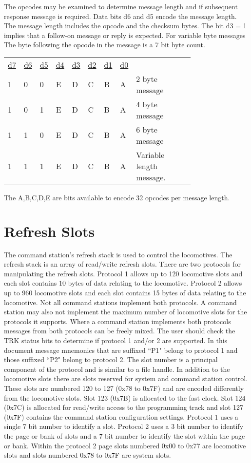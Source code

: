 The opcodes may be examined to determine message length and if subsequent response message is required. Data bits d6 and d5 encode the message length. The message length includes the opcode and the checksum bytes. The bit d3 = 1 implies that a follow-on message or reply is expected. For variable byte messages  The byte following the opcode in the message is a 7 bit byte count.

\begin{tabular}{p{0.05\linewidth} p{0.05\linewidth}  p{0.05\linewidth}  p{0.05\linewidth}  p{0.05\linewidth}  p{0.05\linewidth}  p{0.05\linewidth}  p{0.05\linewidth} p{0.36\linewidth}} 
\underline{d7} & \underline{d6} & \underline{d5} & \underline{d4} & \underline{d3} & \underline{d2} & \underline{d1} & \underline{d0} & \\
1 & 0 & 0 & E & D & C & B & A & 2 byte message\\
1 & 0 & 1 & E & D & C & B & A & 4 byte message\\
1 & 1 & 0 & E & D & C & B & A & 6 byte message\\
1 & 1 & 1 & E & D & C & B & A & Variable length message.\\
\end{tabular}

The A,B,C,D,E are bits available to encode 32 opcodes per message length.

\section{Refresh Slots}

The command station's refresh stack is used to control the locomotives. The refresh stack is an array of read/write refresh slots. There are two protocols for manipulating the refresh slots. Protocol 1 allows up to 120 locomotive slots and each slot contains 10 bytes of data relating to the locomotive. Protocol 2 allows up to 960 locomotive slots and each slot contains 15 bytes of data relating to the locomotive. Not all command stations implement both protocols. A command station may also not implement the maximum number of locomotive slots for the protocols it supports. Where a command station implements both protocols messages from both protocols can be freely mixed. The user should check the TRK status bits to determine if protocol 1 and/or 2 are supported. In this document message mnemonics that are suffixed ``P1" belong to protocol 1 and those suffixed ``P2" belong to protocol 2. The slot number is a principal component of the protocol and is similar to a file handle. In addition to the locomotive slots there are slots reserved for system and command station control. These slots are numbered 120 to 127 (0x78 to 0x7F) and are encoded differently from the locomotive slots. Slot 123 (0x7B) is allocated to the fast clock. Slot 124 (0x7C) is allocated for read/write access to the programming track and slot 127 (0x7F) contains the command station configuration settings. Protocol 1 uses a single 7 bit number to identify a slot. Protocol 2 uses a 3 bit number to identify the page or bank of slots and a 7 bit number to identify the slot within the page or bank. Within the protocol 2 page slots numbered 0x00 to 0x77 are locomotive slots and slots numbered 0x78 to 0x7F are system slots.


